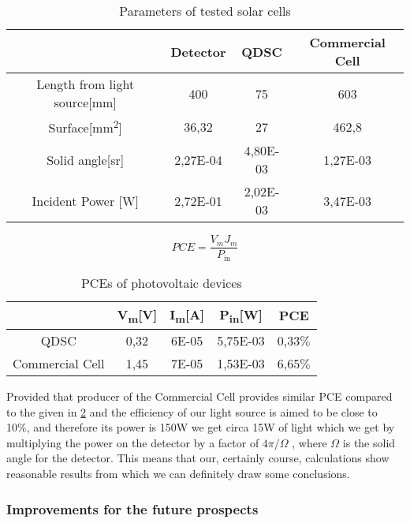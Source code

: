\begin{table}[ht]
\centering
\begin{tabular}{|c |c | c | c |}
\hline
& Detector & QDSC & Commercial Cell\\
\hline
Length from light source{[}mm{]} & 400 & 75 & 603\\
\hline
Surface{[}mm\textsuperscript{2}{]} & 36,32 & 27 & 462,8\\
\hline
Solid angle{[}sr{]} & 2,27E-04 & 4,80E-03 & 1,27E-03\\
\hline
Incident Power {[}W{]} & 2,72E-01 & 2,02E-03 & 3,47E-03\\
\hline
\end{tabular}
\caption{Parameters of tested solar cells}
\label{tab:1stparam}
\end{table}

\begin{equation}
PCE = \frac{V_{m}J_{m}}{P_{\text{in}}}
\end{equation}

\begin{table}[ht]
\centering
\begin{tabular}{|c |c |c | c | c|}
\hline
& V\textsubscript{m}{[}V{]} & I\textsubscript{m}{[}A{]} &P\textsubscript{in}{[}W{]} & PCE\\
\hline
QDSC & 0,32 & 6E-05 & 5,75E-03 & 0,33$\%$\\
\hline
Commercial Cell & 1,45 & 7E-05 & 1,53E-03 & 6,65$\%$\\
\hline
\end{tabular}
\caption{PCEs of photovoltaic devices}
\label{tab:1stPCE}
\end{table}
Provided that producer of the Commercial Cell provides similar PCE
compared to the given in \ref{tab:1stPCE} and the efficiency of our light
source is aimed to be close to 10\%, and therefore its power is 150W we
get circa 15W of light which we get by multiplying the power on the
detector by a factor of $4\pi /\Omega $ , where $\Omega$ is the solid angle for the
detector. This means that our, certainly course, calculations show
reasonable results from which we can definitely draw some conclusions.

\subsubsection{Improvements for the future prospects}

